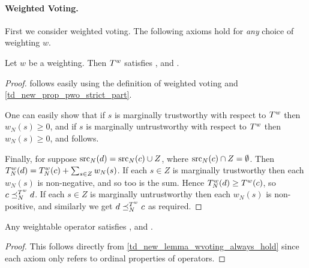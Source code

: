 

\paragraph{Weighted Voting.}

First we consider weighted voting. The following axioms hold for \emph{any}
choice of weighting $w$.

\begin{lemma}
    \label{td_new_lemma_wvoting_always_hold}
    Let $w$ be a weighting. Then $T^{w}$ satisfies \claimcoherence{},
    \marginaltrustworthiness{} and \trustbasedmon{}.
\end{lemma}

\begin{proof}
    \claimcoherence{} follows easily using the definition of weighted
    voting and \cref{td_new_prop_pwo_strict_part}.

    One can easily show that if $s$ is marginally trustworthy with respect to
    $T^{w}$ then $w_N(s) \ge 0$, and if $s$ is marginally untrustworthy
    with respect to $T^{w}$ then $w_N(s) \ge 0$, and
    \marginaltrustworthiness{} follows.

    Finally, for \trustbasedmon{} suppose $\operatorname{src}_N(d) = \operatorname{src}_N(c) \cup Z$, where
    $\operatorname{src}_N(c) \cap Z = \emptyset$. Then $T^{w}_N(d) = T^{w}_N(c) +
    \sum_{s \in Z}{w_N(s)}$. If each $s \in Z$ is marginally trustworthy then
    each $w_N(s)$ is non-negative, and so too is the sum. Hence
    $T^{w}_N(d) \ge T^{w}(c)$, so $c \preceq_N^{T^{w}} d$. If
    each $s \in Z$ is marginally untrustworthy then each $w_N(s)$ is
    non-positive, and similarly we get $d \preceq_N^{T^{w}} c$ as required.
\end{proof}

\begin{corollary}
    \label{td_new_cor_weightable_axioms}
    Any weightable operator satisfies \claimcoherence{},
    \marginaltrustworthiness{} and \trustbasedmon{}.
\end{corollary}

\begin{proof}
    This follows directly from \cref{td_new_lemma_wvoting_always_hold} since
    each axiom only refers to ordinal properties of operators.
\end{proof}

